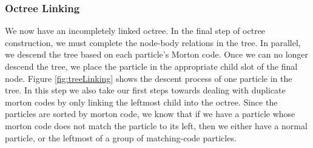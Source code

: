 \documentclass{thesis}
\begin{document}
        

\subsubsection{Octree Linking}
We now have an incompletely linked octree. In the final step of octree construction, we must complete the node-body relations in the tree. In parallel, we descend the tree based on each particle's Morton code. Once we can no longer descend the tree, we place the particle in the appropriate child slot of the final node. Figure \ref{fig:treeLinking} shows the descent process of one particle in the tree. In this step we also take our first steps towards dealing with duplicate morton codes by only linking the leftmost child into the octree. Since the particles are sorted by morton code, we know that if we have a particle whose morton code does not match the particle to its left, then we either have a normal particle, or the leftmost of a group of matching-code particles.
\end{document}
